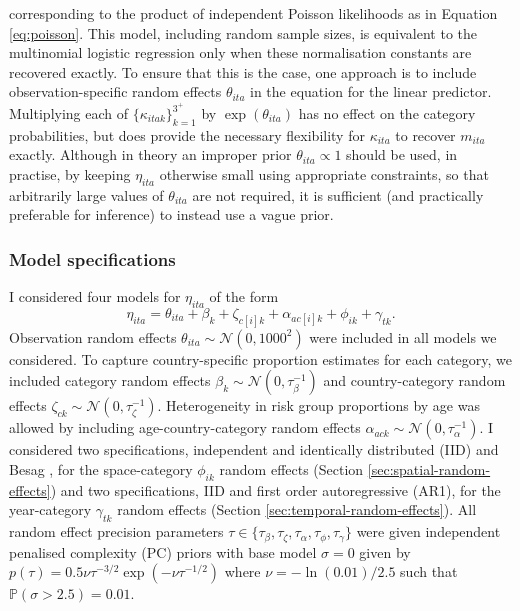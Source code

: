 \documentclass[a4paper, nobind]{templates/ociamthesis}
\begin{document}
corresponding to the product of independent Poisson likelihoods as in Equation \ref{eq:poisson}.
This model, including random sample sizes, is equivalent to the multinomial logistic regression only when these normalisation constants are recovered exactly.
To ensure that this is the case, one approach is to include observation-specific random effects \(\theta_{ita}\) in the equation for the linear predictor.
Multiplying each of \(\{\kappa_{itak}\}_{k = 1}^{3^+}\) by \(\exp(\theta_{ita})\) has no effect on the category probabilities, but does provide the necessary flexibility for \(\kappa_{ita}\) to recover \(m_{ita}\) exactly.
Although in theory an improper prior \(\theta_{ita} \propto 1\) should be used, in practise, by keeping \(\eta_{ita}\) otherwise small using appropriate constraints, so that arbitrarily large values of \(\theta_{ita}\) are not required, it is sufficient (and practically preferable for inference) to instead use a vague prior.

\hypertarget{model-specifications}{%
\subsubsection{Model specifications}\label{model-specifications}}

I considered four models for \(\eta_{ita}\) of the form
\[
\eta_{ita} = \theta_{ita} + \beta_k + \zeta_{c[i]k} + \alpha_{ac[i]k} + \phi_{ik} + \gamma_{tk}.
\]
Observation random effects \(\theta_{ita} \sim \mathcal{N}(0, 1000^2)\) were included in all models we considered.
To capture country-specific proportion estimates for each category, we included category random effects \(\beta_k \sim \mathcal{N}(0, \tau_\beta^{-1})\) and country-category random effects \(\zeta_{ck} \sim \mathcal{N}(0, \tau_\zeta^{-1})\).
Heterogeneity in risk group proportions by age was allowed by including age-country-category random effects \(\alpha_{ack} \sim \mathcal{N}(0, \tau_\alpha^{-1})\).
I considered two specifications, independent and identically distributed (IID) and Besag \autocite{besag1991bayesian}, for the space-category \(\phi_{ik}\) random effects (Section \ref{sec:spatial-random-effects}) and two specifications, IID and first order autoregressive (AR1), for the year-category \(\gamma_{tk}\) random effects (Section \ref{sec:temporal-random-effects}).
All random effect precision parameters \(\tau \in \{\tau_\beta, \tau_\zeta, \tau_\alpha, \tau_\phi, \tau_\gamma\}\) were given independent penalised complexity (PC) priors \autocite{simpson2017penalising} with base model \(\sigma = 0\) given by \(p(\tau) = 0.5 \nu \tau^{-3/2} \exp \left( - \nu \tau^{-1/2} \right)\) where \(\nu = - \ln(0.01) / 2.5\) such that \(\mathbb{P}(\sigma > 2.5) = 0.01\).
\end{document}
